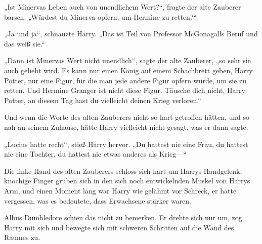 „Ist Minervas Leben auch von unendlichem Wert?“, fragte der alte Zauberer barsch. „Würdest du Minerva opfern, um Hermine zu retten?“

„Ja und ja“, schnauzte Harry. „Das ist Teil von Professor McGonagalls Beruf und das weiß sie.“

„Dann ist Minervas Wert nicht unendlich“, sagte der alte Zauberer, „so sehr sie auch geliebt wird. Es kann nur einen König auf einem Schachbrett geben, Harry Potter, nur eine Figur, für die man jede andere Figur opfern würde, um sie zu retten. Und Hermine Granger ist nicht diese Figur. Täusche dich nicht, Harry Potter, an diesem Tag hast du vielleicht deinen Krieg verloren.“

Und wenn die Worte des alten Zauberers nicht so hart getroffen hätten, und so nah an seinem Zuhause, hätte Harry vielleicht nicht gesagt, was er dann sagte.

„Lucius hatte recht“, stieß Harry hervor. „Du hattest nie eine Frau, du hattest nie eine Tochter, du hattest nie etwas anderes als Krieg—“

Die linke Hand des alten Zauberers schloss sich hart um Harrys Handgelenk, knochige Finger gruben sich in den sich noch entwickelnden Muskel von Harrys Arm, und einen Moment lang war Harry wie gelähmt vor Schreck, er hatte vergessen, was es bedeutete, dass Erwachsene stärker waren.

Albus Dumbledore schien das nicht zu bemerken. Er drehte sich nur um, zog Harry mit sich und bewegte sich mit schweren Schritten auf die Wand des Raumes zu.

